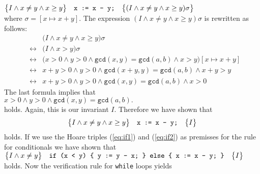 $\bigl\{I \wedge x \not= y \wedge x \geq y\bigr\}\quad\texttt{x := x - y;}\quad\bigl\{(I \wedge x \not= y \wedge x \geq y)\sigma\bigr\}$ 
\\[0.2cm]
where $\sigma = [x \mapsto x + y]$. The expression $(I \wedge x \not= y \wedge x \geq y)\sigma$ is rewritten as follows:
\begin{eqnarray*}
 &   & \bigl(I \wedge x \not= y \wedge x \geq y\bigr)\sigma \\
 & \leftrightarrow & \bigl(I \wedge x > y \bigr)\sigma \\
 & \leftrightarrow & \bigl(x > 0 \wedge y > 0 \wedge \texttt{gcd}(x,y) = \texttt{gcd}(a,b) \wedge 
             x > y \bigr)[x \mapsto x + y] \\
 & \leftrightarrow & x + y > 0 \wedge y > 0 \wedge \texttt{gcd}(x+y,y) = \texttt{gcd}(a,b) 
       \wedge x + y > y  \\
 & \leftrightarrow & x + y > 0 \wedge y > 0 \wedge \texttt{gcd}(x,y) = \texttt{gcd}(a,b) 
       \wedge x > 0 
\end{eqnarray*}
The last formula implies that
\\[0.2cm]
\hspace*{1.3cm}
$ x > 0 \wedge y > 0 \wedge \texttt{gcd}(x,y) = \texttt{gcd}(a,b). $
\\[0.2cm]
holds.  Again, this is our invariant $I$.  Therefore we have shown that
\begin{equation}
  \label{eq:if2}
  \bigl\{I \wedge x \not= y \wedge x \geq y\bigr\}\quad\texttt{x := x - y;}\quad\bigl\{I\bigr\} 
\end{equation}
holds.  If we use the Hoare triples (\ref{eq:if1}) and (\ref{eq:if2}) as premisses
for the rule for conditionals we have shown that
\\[0.2cm]
\hspace*{1.3cm}
$  \bigl\{I \wedge x \not= y\bigr\}\quad\texttt{if (x < y) \{ y := y - x; \} else \{  x := x - y; \}}\quad\bigl\{I\bigr\} $
\\[0.2cm]
holds.  Now the verification rule for \texttt{while} loops yields
\pagebreak


